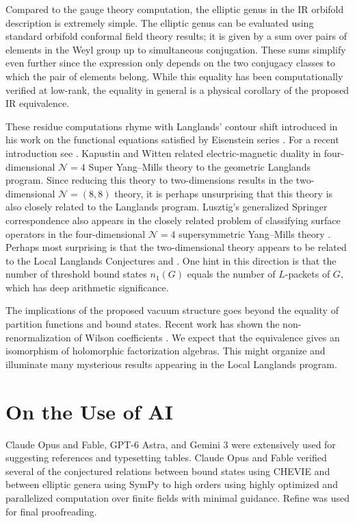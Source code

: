 \documentclass[12pt]{article}
\numberwithin{equation}{section}%
\theoremstyle{definition}
\newcommand{\cN}{\mathcal{N}}
\begin{document}
Compared to the gauge theory computation, the elliptic genus in the IR orbifold description is extremely simple.
The elliptic genus can be evaluated using standard orbifold conformal field theory results; it is given by a sum over pairs of elements in the Weyl group up to simultaneous conjugation.  These sums simplify even further since the expression only depends on the two conjugacy classes to which the pair of elements belong.  While this equality has been computationally verified at low-rank, the equality in general is a physical corollary of the proposed IR equivalence.

These residue computations rhyme with Langlands' contour shift introduced in his work on the functional equations satisfied by Eisenstein series \cite{MR579181}.  For a recent introduction see \cite{MR4943615, hegde2026rethinkingworklanglandseisenstein}.  
Kapustin and Witten related electric-magnetic duality in four-dimensional $\mathcal{N} = 4$ Super Yang--Mills theory to the geometric Langlands program.  Since reducing this theory to two-dimensions results in the two-dimensional $\cN = (8,8)$ theory, it is perhaps unsurprising that this theory is also closely related to the Langlands program.  Lusztig's generalized Springer correspondence also appears in the closely related problem of classifying surface operators in the four-dimensional $\cN = 4$ supersymmetric Yang--Mills theory \cite{Balasubramanian:2014jca}.  Perhaps most surprising is that the two-dimensional theory appears to be related to the Local Langlands Conjectures and \cite{ginzburg1995residueconstructionheckealgebras, MR1413870}.
One hint in this direction is that the number of threshold bound states $n_1(G)$ equals the number of $L$-packets of $G,$
which has deep arithmetic significance.

The implications of the proposed vacuum structure goes beyond the equality of partition functions and bound states.  Recent work has shown the non-renormalization of Wilson coefficients \cite{Bajaj:2026oja}.  We expect that the equivalence gives an isomorphism of holomorphic factorization algebras.  This might organize and illuminate many mysterious results appearing in the Local Langlands program.
\section*{On the Use of AI}
Claude Opus and Fable, GPT-6 Astra, and Gemini 3 were extensively used for suggesting references and typesetting tables.  Claude Opus and Fable verified several of the conjectured relations between bound states using CHEVIE \cite{GH96} and between elliptic genera using SymPy \cite{SymPy} to high orders using highly optimized and parallelized computation over finite fields with minimal guidance.  Refine was used for final proofreading.
\end{document}
